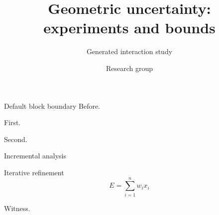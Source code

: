 \documentclass[9pt,aspectratio=43]{beamer}
\title{Geometric uncertainty: experiments and bounds}
\subtitle{Generated interaction study}
\author{Research group}
\date{}
\begin{document}
\begin{frame}[t,shrink=5]{Default block boundary}
Before.\par\begin{description}\item<1->[Stage 1] First.\item<2->[Stage 2] Second.
\item<3->[Stage 3] \begin{block}{Incremental analysis}\begin{block}{Iterative refinement}\[E=\sum_{i=1}^{n}w_i x_i\]\end{block}\end{block}\end{description}\par Witness.\end{frame}
\end{document}
